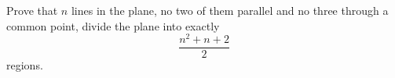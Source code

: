 Prove that $n$ lines in the plane, no two of them parallel and no three through a common point, divide the plane into exactly
\[
\dfrac{n^2+n+2}{2}
\]
regions.
